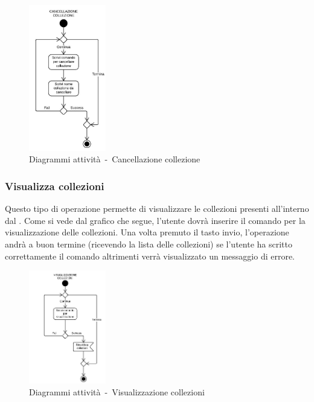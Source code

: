 \documentclass{scalatekids-article}
\begin{document}
\begin{figure}[H]
  \begin{center}
    \includegraphics[width=0.3\textwidth, keepaspectratio]{img/diagrammiAttivita/cancCollezione.jpeg}
    \caption{Diagrammi attività\ -\ Cancellazione collezione}
  \end{center}
\end{figure}

\subsubsection{Visualizza collezioni}

Questo tipo di operazione permette di visualizzare le collezioni presenti
all'interno dal . Come si vede dal grafico che segue, l'utente dovrà
inserire il comando per la visualizzazione delle collezioni. Una volta premuto
il tasto invio, l'operazione andrà a buon termine (ricevendo la lista delle
collezioni) se l'utente ha scritto correttamente il comando altrimenti verrà
visualizzato un messaggio di errore.

\begin{figure}[H]
  \begin{center}
    \includegraphics[width=0.3\textwidth, keepaspectratio]{img/diagrammiAttivita/visCollezione.jpeg}
    \caption{Diagrammi attività\ -\ Visualizzazione collezioni}
  \end{center}
\end{figure}
\end{document}
